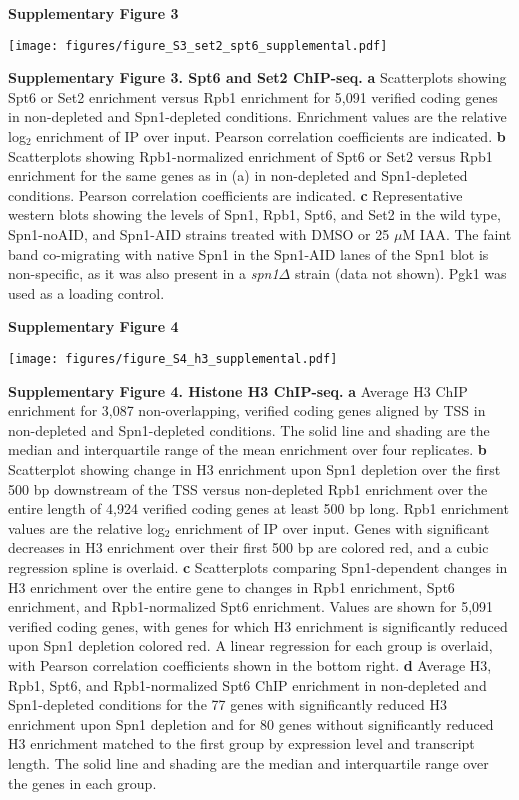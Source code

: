 \documentclass[8pt]{extarticle}
\begin{document}
\newpage

\textbf{\large Supplementary Figure 3}

{\texttt{[image: figures/figure\_S3\_set2\_spt6\_supplemental.pdf]}\par}

\vspace{2em}
\textbf{Supplementary Figure 3. Spt6 and Set2 ChIP-seq.}
\textbf{a} Scatterplots showing Spt6 or Set2 enrichment versus Rpb1 enrichment for 5,091 verified coding genes in non-depleted and Spn1-depleted conditions.
Enrichment values are the relative log$_2$ enrichment of IP over input.
Pearson correlation coefficients are indicated.
\textbf{b} Scatterplots showing Rpb1-normalized enrichment of Spt6 or Set2 versus Rpb1 enrichment for the same genes as in (a) in non-depleted and Spn1-depleted conditions.
Pearson correlation coefficients are indicated.
\textbf{c} Representative western blots showing the levels of Spn1, Rpb1, Spt6, and Set2 in the wild type, Spn1-noAID, and Spn1-AID strains treated with DMSO or 25 $\mu$M IAA.
The faint band co-migrating with native Spn1 in the Spn1-AID lanes of the Spn1 blot is non-specific, as it was also present in a \textit{spn1$\Delta$} strain (data not shown).
Pgk1 was used as a loading control.

\newpage

\textbf{\large Supplementary Figure 4}

{\texttt{[image: figures/figure\_S4\_h3\_supplemental.pdf]}\par}

\vspace{2em}
\textbf{Supplementary Figure 4. Histone H3 ChIP-seq.}
\textbf{a} Average H3 ChIP enrichment for 3,087 non-overlapping, verified coding genes aligned by TSS in non-depleted and Spn1-depleted conditions.
The solid line and shading are the median and interquartile range of the mean enrichment over four replicates.
\textbf{b} Scatterplot showing change in H3 enrichment upon Spn1 depletion over the first 500 bp downstream of the TSS versus non-depleted Rpb1 enrichment over the entire length of 4,924 verified coding genes at least 500 bp long.
Rpb1 enrichment values are the relative log$_2$ enrichment of IP over input.
Genes with significant decreases in H3 enrichment over their first 500 bp are colored red, and a cubic regression spline is overlaid.
\textbf{c} Scatterplots comparing Spn1-dependent changes in H3 enrichment over the entire gene to changes in Rpb1 enrichment, Spt6 enrichment, and Rpb1-normalized Spt6 enrichment.
Values are shown for 5,091 verified coding genes, with genes for which H3 enrichment is significantly reduced upon Spn1 depletion colored red.
A linear regression for each group is overlaid, with Pearson correlation coefficients shown in the bottom right.
\textbf{d} Average H3, Rpb1, Spt6, and Rpb1-normalized Spt6 ChIP enrichment in non-depleted and Spn1-depleted conditions for the 77 genes with significantly reduced H3 enrichment upon Spn1 depletion and for 80 genes without significantly reduced H3 enrichment matched to the first group by expression level and transcript length.
The solid line and shading are the median and interquartile range over the genes in each group.
\end{document}
